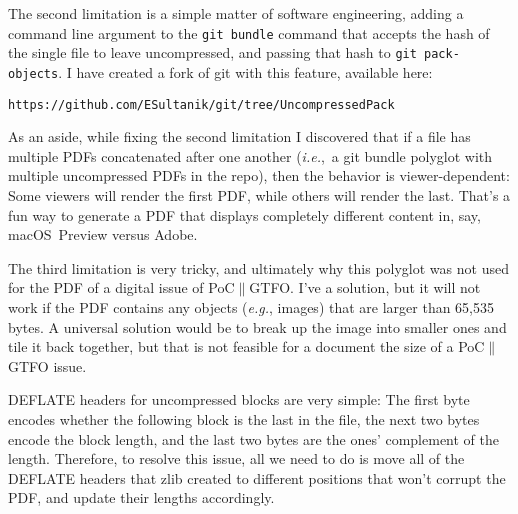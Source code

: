 \documentclass{article}
\begin{document}
The second limitation is a simple matter of software engineering,
adding a command line argument to the \texttt{git bundle} command that
accepts the hash of the single file to leave uncompressed, and passing
that hash to \texttt{git pack-objects}. I have created a fork of git
with this feature, available here:
\begin{center}
  \texttt{https://github.com/ESultanik/git/tree/UncompressedPack}
\end{center}

As an aside, while fixing the second limitation I discovered that if a
file has multiple PDFs concatenated after one another
(\textit{i.e.},~a git bundle polyglot with multiple uncompressed PDFs
in the repo), then the behavior is viewer-dependent: Some viewers will
render the first PDF, while others will render the last.  That's a fun
way to generate a PDF that displays completely different content in,
say, macOS~Preview versus Adobe.

The third limitation is very tricky, and ultimately why this polyglot
was not used for the PDF of a digital issue of PoC$\|$GTFO. I've a
solution, but it will not work if the PDF contains any objects
(\textit{e.g.}, images) that are larger than 65,535 bytes. A universal
solution would be to break up the image into smaller ones and tile it
back together, but that is not feasible for a document the size of a
PoC$\|$GTFO issue.

DEFLATE headers for uncompressed blocks are very simple: The first
byte encodes whether the following block is the last in the file, the
next two bytes encode the block length, and the last two bytes are the
ones' complement of the length.  Therefore, to resolve this issue, all
we need to do is move all of the DEFLATE headers that zlib created to
different positions that won't corrupt the PDF, and update their
lengths accordingly.
\end{document}
